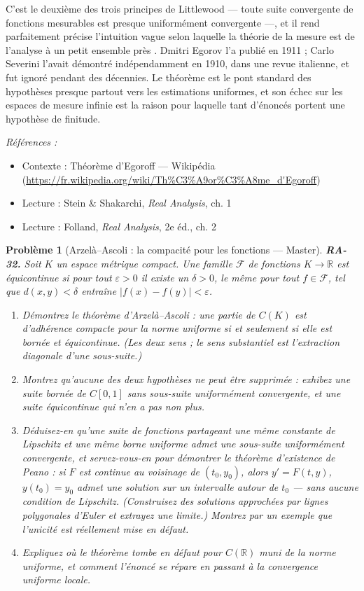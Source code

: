 \documentclass[11pt]{article}
\newtheorem{problem}{Problème}
\newenvironment{refs}{\par\small\noindent\emph{Références :}\begin{itemize}\setlength\itemsep{0pt}}{\end{itemize}\normalsize}
\begin{document}
\noindent C'est le deuxième des trois principes de Littlewood --- toute suite convergente de
fonctions mesurables est presque uniformément convergente ---, et il rend parfaitement précise
l'intuition vague selon laquelle la théorie de la mesure est \og{} de l'analyse à un petit ensemble
près \fg{}. Dmitri Egorov l'a publié en 1911 ; Carlo Severini l'avait démontré indépendamment en 1910,
dans une revue italienne, et fut ignoré pendant des décennies. Le théorème est le pont standard des
hypothèses \og{} presque partout \fg{} vers les estimations uniformes, et son échec sur les espaces de
mesure infinie est la raison pour laquelle tant d'énoncés portent une hypothèse de finitude.

\begin{refs}
\item Contexte : Théorème d'Egoroff --- Wikipédia (\url{https://fr.wikipedia.org/wiki/Th%C3%A9or%C3%A8me_d'Egoroff})
\item Lecture : Stein \& Shakarchi, \textit{Real Analysis}, ch. 1
\item Lecture : Folland, \textit{Real Analysis}, 2e éd., ch. 2
\end{refs}

\bigskip

\begin{problem}[{Arzelà--Ascoli : la compacité pour les fonctions --- Master}]
\textbf{RA-32.} Soit $ K $ un espace métrique compact. Une famille $ \mathcal{F} $ de
fonctions $ K \to \mathbb{R} $ est \textit{équicontinue} si pour tout
$ \varepsilon > 0 $ il existe un $ \delta > 0 $, le même pour tout
$ f \in \mathcal{F} $, tel que $ d(x,y) < \delta $ entraîne
$ |f(x) - f(y)| < \varepsilon $.
\begin{enumerate}
\item[(a)] Démontrez le théorème d'Arzelà--Ascoli : une partie de $ C(K) $ est d'adhérence compacte pour
la norme uniforme si et seulement si elle est bornée et équicontinue. (Les deux sens ; le sens
substantiel est l'extraction diagonale d'une sous-suite.)
\item[(b)] Montrez qu'aucune des deux hypothèses ne peut être supprimée : exhibez une suite bornée de
$ C[0,1] $ sans sous-suite uniformément convergente, et une suite équicontinue qui n'en a pas non
plus.
\item[(c)] Déduisez-en qu'une suite de fonctions partageant une même constante de Lipschitz et une même
borne uniforme admet une sous-suite uniformément convergente, et servez-vous-en pour démontrer le
théorème d'existence de Peano : si $ F $ est continue au voisinage de $ (t_0, y_0) $, alors
$ y' = F(t, y) $, $ y(t_0) = y_0 $ admet une solution sur un intervalle autour de $ t_0 $ ---
sans aucune condition de Lipschitz. (Construisez des solutions approchées par lignes polygonales
d'Euler et extrayez une limite.) Montrez par un exemple que l'unicité est réellement mise en
défaut.
\item[(d)] Expliquez où le théorème tombe en défaut pour $ C(\mathbb{R}) $ muni de la norme uniforme, et
comment l'énoncé se répare en passant à la convergence uniforme locale.
\end{enumerate}

\end{problem}
\end{document}
